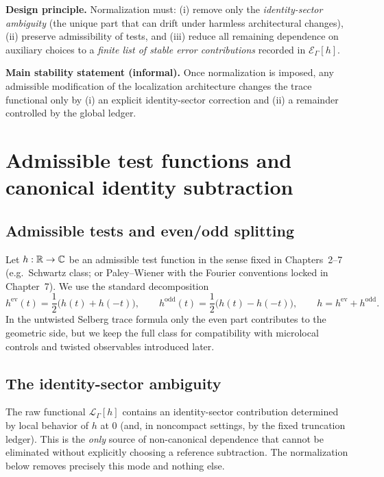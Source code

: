 \medskip
\noindent\textbf{Design principle.}
Normalization must:
(i) remove only the \emph{identity-sector ambiguity} (the unique part that can drift under harmless architectural changes),
(ii) preserve admissibility of tests, and
(iii) reduce all remaining dependence on auxiliary choices to a \emph{finite list of stable error contributions}
recorded in $\mathcal E_\Gamma[h]$.

\medskip
\noindent\textbf{Main stability statement (informal).}
Once normalization is imposed, any admissible modification of the localization architecture changes the trace functional only by
(i) an explicit identity-sector correction and
(ii) a remainder controlled by the global ledger.

\section{Admissible test functions and canonical identity subtraction}
\label{sec:08.test-class}

\subsection{Admissible tests and even/odd splitting}\label{subsec:08.even-odd}

Let $h:\mathbb{R}\to\mathbb{C}$ be an admissible test function in the sense fixed in Chapters~2--7
(e.g.\ Schwartz class; or Paley--Wiener with the Fourier conventions locked in Chapter~7).
We use the standard decomposition
\[
h^{\mathrm{ev}}(t)=\frac12\bigl(h(t)+h(-t)\bigr),
\qquad
h^{\mathrm{odd}}(t)=\frac12\bigl(h(t)-h(-t)\bigr),
\qquad h=h^{\mathrm{ev}}+h^{\mathrm{odd}}.
\]
In the untwisted Selberg trace formula only the even part contributes to the geometric side, but we keep the full class for
compatibility with microlocal controls and twisted observables introduced later.

\subsection{The identity-sector ambiguity}\label{subsec:08.identity-ambiguity}

The raw functional $\mathcal L_\Gamma[h]$ contains an identity-sector contribution determined by local behavior of $h$ at $0$
(and, in noncompact settings, by the fixed truncation ledger). This is the \emph{only} source of non-canonical dependence that
cannot be eliminated without explicitly choosing a reference subtraction. The normalization below removes precisely this mode
and nothing else.

